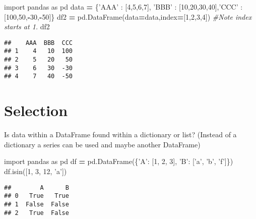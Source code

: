 \documentclass[]{book}
\newenvironment{Shaded}{\begin{snugshade}}{\end{snugshade}}
\newcommand{\CommentTok}[1]{\textcolor[rgb]{0.56,0.35,0.01}{\textit{#1}}}
\newcommand{\DecValTok}[1]{\textcolor[rgb]{0.00,0.00,0.81}{#1}}
\newcommand{\ImportTok}[1]{#1}
\newcommand{\NormalTok}[1]{#1}
\newcommand{\OperatorTok}[1]{\textcolor[rgb]{0.81,0.36,0.00}{\textbf{#1}}}
\newcommand{\StringTok}[1]{\textcolor[rgb]{0.31,0.60,0.02}{#1}}
\begin{document}
\begin{Shaded}
\begin{Highlighting}[]
\ImportTok{import}\NormalTok{ pandas }\ImportTok{as}\NormalTok{ pd}
\NormalTok{data }\OperatorTok{=}\NormalTok{ \{}\StringTok{'AAA'}\NormalTok{ : [}\DecValTok{4}\NormalTok{,}\DecValTok{5}\NormalTok{,}\DecValTok{6}\NormalTok{,}\DecValTok{7}\NormalTok{], }\StringTok{'BBB'}\NormalTok{ : [}\DecValTok{10}\NormalTok{,}\DecValTok{20}\NormalTok{,}\DecValTok{30}\NormalTok{,}\DecValTok{40}\NormalTok{],}\StringTok{'CCC'}\NormalTok{ : [}\DecValTok{100}\NormalTok{,}\DecValTok{50}\NormalTok{,}\OperatorTok{-}\DecValTok{30}\NormalTok{,}\OperatorTok{-}\DecValTok{50}\NormalTok{]\}}
\NormalTok{df2 }\OperatorTok{=}\NormalTok{ pd.DataFrame(data}\OperatorTok{=}\NormalTok{data,index}\OperatorTok{=}\NormalTok{[}\DecValTok{1}\NormalTok{,}\DecValTok{2}\NormalTok{,}\DecValTok{3}\NormalTok{,}\DecValTok{4}\NormalTok{]) }\CommentTok{#Note index starts at 1.}
\NormalTok{df2}
\end{Highlighting}
\end{Shaded}

\begin{verbatim}
##    AAA  BBB  CCC
## 1    4   10  100
## 2    5   20   50
## 3    6   30  -30
## 4    7   40  -50
\end{verbatim}

\hypertarget{selection}{%
\section{Selection}\label{selection}}

Is data within a DataFrame found within a dictionary or list? (Instead of a dictionary a series can be used and maybe another DataFrame)

\begin{Shaded}
\begin{Highlighting}[]
\ImportTok{import}\NormalTok{ pandas }\ImportTok{as}\NormalTok{ pd}
\NormalTok{df }\OperatorTok{=}\NormalTok{ pd.DataFrame(\{}\StringTok{'A'}\NormalTok{: [}\DecValTok{1}\NormalTok{, }\DecValTok{2}\NormalTok{, }\DecValTok{3}\NormalTok{], }\StringTok{'B'}\NormalTok{: [}\StringTok{'a'}\NormalTok{, }\StringTok{'b'}\NormalTok{, }\StringTok{'f'}\NormalTok{]\})}
\NormalTok{df.isin([}\DecValTok{1}\NormalTok{, }\DecValTok{3}\NormalTok{, }\DecValTok{12}\NormalTok{, }\StringTok{'a'}\NormalTok{])}
\end{Highlighting}
\end{Shaded}

\begin{verbatim}
##        A      B
## 0   True   True
## 1  False  False
## 2   True  False
\end{verbatim}
\end{document}
